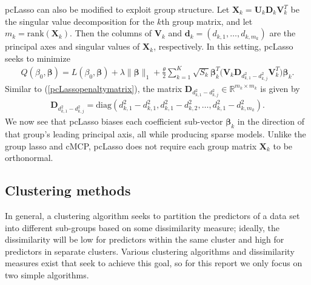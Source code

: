 \documentclass[11pt]{article}
\newcommand{\citeay}[1]{\citeauthor{#1} \citeyear{#1}}
\begin{document}
pcLasso can also be modified to exploit group structure. Let $\mathbf{X}_k = \mathbf{U}_k \mathbf{D}_k \mathbf{V}_k^T$ be the singular value decomposition for the $k$th group matrix, and let $m_k = \mathrm{rank}(\mathbf{X}_k)$. Then the columns of $\mathbf{V}_k$ and $\bm{d}_k = (d_{k,1}, \ldots, d_{k, m_k})$ are the principal axes and singular values of $\mathbf{X}_k$, respectively. In this setting, pcLasso seeks to minimize
\begin{align}
    \label{pcLassogroup}
    Q(\beta_0, \bm{\beta}) = L(\beta_0, \bm{\beta}) + \lambda \| \bm{\beta} \|_1 + \frac{\theta}{2} \sum_{k=1}^K \sqrt{S_k} \bm{\beta}_k^T \Big( \mathbf{V}_k \mathbf{D}_{d_{k,1}^2 - d_{k,j}^2} \mathbf{V}_k^T \Big) \bm{\beta}_k.
\end{align}
Similar to (\ref{pcLassopenaltymatrix}), the matrix $\mathbf{D}_{d_{k,1}^2 - d_{k,j}^2} \in \mathbb{R}^{m_k \times m_k}$ is given by 
\begin{align}
    \label{pcLassopenaltymatrixgroup}
    \mathbf{D}_{d_{k,1}^2 - d_{k,j}^2} = \mathrm{diag}(d_{k,1}^2 - d_{k,1}^2, d_{k,1}^2 - d_{k,2}^2, \ldots, d_{k,1}^2 - d_{k,m_k}^2).
\end{align}
We now see that pcLasso biases each coefficient sub-vector $\bm{\beta}_k$ in the direction of that group's leading principal axis, all while producing sparse models. Unlike the group lasso and cMCP, pcLasso does not require each group matrix $\mathbf{X}_k$ to be orthonormal. 



\subsection{Clustering methods}

In general, a clustering algorithm seeks to partition the predictors of a data set into different sub-groups based on some dissimilarity measure; ideally, the dissimilarity will be low for predictors within the same cluster and high for predictors in separate clusters. Various clustering algorithms and dissimilarity measures exist that seek to achieve this goal, so for this report we only focus on two simple algorithms.
\end{document}
